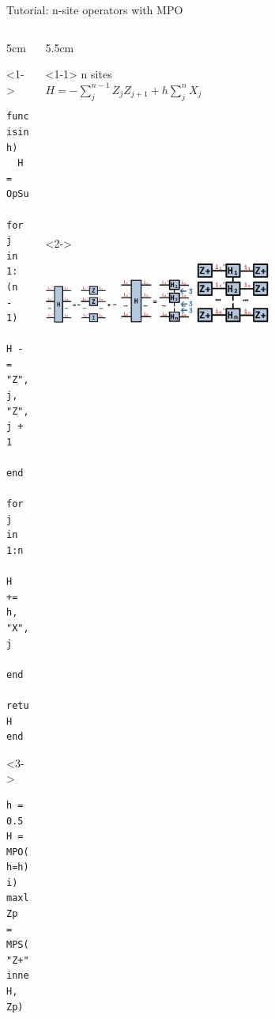 \begin{frame}[fragile]{Tutorial: n-site operators with MPO}

\begin{columns}

\begin{column}{5cm}

\begin{onlyenv}<1->
\begin{lstlisting}[language=JuliaLocal, style=julia, mathescape, basicstyle=\small]
function ising(n; h)
  H = OpSum()
  for j in 1:(n - 1)
    H -= "Z", j, "Z", j + 1
  end
  for j in 1:n
    H += h, "X", j
  end
  return H
end
\end{lstlisting}
\end{onlyenv}

\begin{onlyenv}<3->
\begin{lstlisting}[language=JuliaLocal, style=julia, mathescape, basicstyle=\small]
h = 0.5
H = MPO(ising(n; h=h), i)
maxlinkdim(H)
Zp = MPS(i, "Z+")
inner(Zp', H, Zp)
 \end{lstlisting}
\end{onlyenv}

\end{column}

\begin{column}{5.5cm}

\begin{onlyenv}<1-1>
n sites \\
$H = -\sum_j^{n-1} Z_j Z_{j+1} + h \sum_j^n X_j$ \\
~\\
~\\
~\\
~\\
~\\
~\\
~\\
~\\
\end{onlyenv}

\begin{onlyenv}<2->
\vspace*{0.0cm}
\begin{center}
\includegraphics[width=0.2\textwidth]{
  slides/assets/isingn.png
}
\includegraphics[width=0.2\textwidth]{
  slides/assets/isingn_mpo.png
}
\includegraphics[width=0.2\textwidth]{
  slides/assets/Zpn_H_Zpn.png
}
\end{center}
\vspace*{0.0cm}
\end{onlyenv}


\end{column}
\end{columns}
\end{frame}
